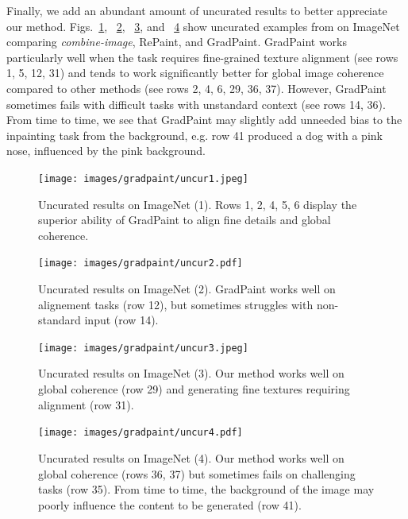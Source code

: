  
Finally, we add an abundant amount of uncurated results to better appreciate our method.
Figs.~\ref{fig:uncur1}, ~\ref{fig:uncur2}, ~\ref{fig:uncur3}, and ~\ref{fig:uncur4} show uncurated 
examples from on ImageNet comparing \emph{combine-image}, RePaint, and GradPaint. GradPaint works particularly well when the 
task requires fine-grained texture alignment (see rows 1, 5, 12, 31)  and tends to work significantly better for global image 
coherence compared to other methods (see rows 2, 4, 6, 29, 36, 37). However, GradPaint sometimes fails with difficult tasks with 
unstandard context (see rows 14, 36). From time to time, we see that GradPaint may slightly add unneeded bias to the inpainting 
task from the background, e.g. row 41 produced a dog with a pink nose, influenced by the pink background. 











\begin{figure}[H]
  \centering
    \texttt{[image: images/gradpaint/uncur1.jpeg]} %
    \caption{Uncurated results on ImageNet (1). Rows 1, 2, 4, 5, 6 display the superior ability of GradPaint to align fine details and global coherence.}
    \label{fig:uncur1}
\end{figure}

\begin{figure}[H]
  \centering
    \texttt{[image: images/gradpaint/uncur2.pdf]}
    \caption{Uncurated results on ImageNet (2). GradPaint works well on alignement tasks (row 12), but sometimes struggles with non-standard input (row 14). }
    \label{fig:uncur2}
\end{figure}

\begin{figure}[H]
  \centering
    \texttt{[image: images/gradpaint/uncur3.jpeg]}
    \caption{Uncurated results on ImageNet (3). Our method works well on global coherence (row 29) and generating fine textures requiring alignment (row 31).}
    \label{fig:uncur3}
\end{figure}

\begin{figure}[H]
  \centering
    \texttt{[image: images/gradpaint/uncur4.pdf]}
    \caption{Uncurated results on ImageNet (4). Our method works well on global coherence (rows 36, 37) but sometimes fails on challenging tasks (row 35). From time to time, the background of the image may poorly influence the content to be generated (row 41).}
    \label{fig:uncur4}
\end{figure}


